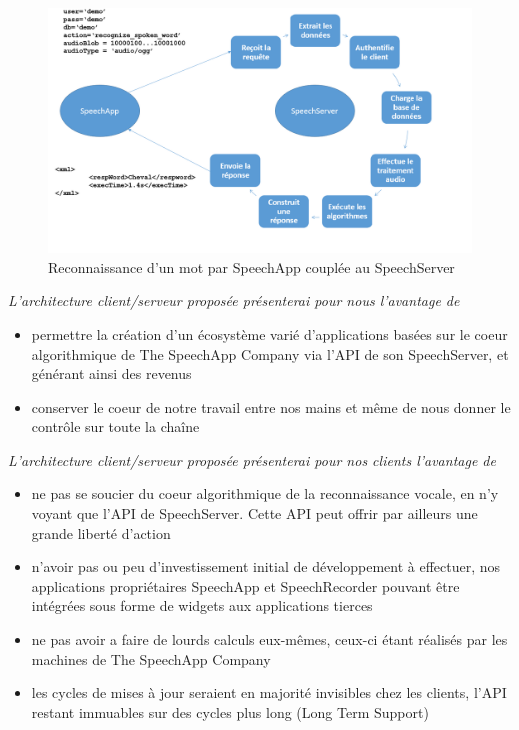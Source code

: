 \documentclass[a4paper,12pt]{report}
\begin{document}
\begin{figure}[H]
	\begin{center}
	\includegraphics[width=14cm]{pics/vieRequete.png} 
	\end{center}
	\caption{Reconnaissance d'un mot par SpeechApp couplée au SpeechServer}
\end{figure}

\emph{L'architecture client/serveur proposée présenterai pour nous l'avantage de}
\begin{itemize}
	\item{permettre la création d'un écosystème varié d'applications basées sur le coeur algorithmique de The SpeechApp Company via l'API de son SpeechServer, et générant ainsi des revenus}
	\item{conserver le coeur de notre travail entre nos mains et même de nous donner le contrôle sur toute la chaîne}
\end{itemize}

\medskip{}

\emph{L'architecture client/serveur proposée présenterai pour nos clients l'avantage de}
\begin{itemize}
	\item{ne pas se soucier du coeur algorithmique de la reconnaissance vocale, en n'y voyant que l'API de SpeechServer. Cette API peut offrir par ailleurs une grande liberté d'action}
	\item{n'avoir pas ou peu d'investissement initial de développement à effectuer, nos applications propriétaires SpeechApp et SpeechRecorder pouvant être intégrées sous forme de widgets aux applications tierces}
	\item{ne pas avoir a faire de lourds calculs eux-mêmes, ceux-ci étant réalisés par les machines de The SpeechApp Company}
	\item{les cycles de mises à jour seraient en majorité invisibles chez les clients, l'API restant immuables sur des cycles plus long (Long Term Support)}
\end{itemize}
\end{document}
